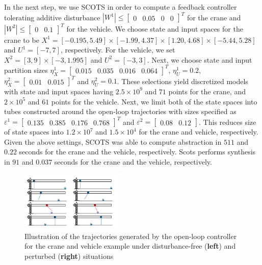 In the next step, we use SCOTS in order to compute a feedback controller tolerating additive disturbance $|W^1|\leq\begin{bmatrix}0&0.05&0&0\end{bmatrix}^T$ for the crane and $|W^2|\leq\begin{bmatrix}0&0.1\end{bmatrix}^T$ for the vehicle. %
We choose state and input spaces for the crane to be $X^{1}=[-0.195,5.49]\times[-1.99,4.37]\times[1.20,4.68]\times[-5.44,5.28]$ and $U^{1}=[-7,7]$, respectively. For the vehicle, we set $X^{2}=[3,9]\times[-3,1.995]$ and $U^{2}=[-3,3]$. %
Next, we choose state and input partition sizes $\eta_{{X}}^{1}=\begin{bmatrix}0.015&0.035&0.016&0.064\end{bmatrix}^T$, $\eta_{U}^1=0.2$,  $\eta_{{X}}^2=\begin{bmatrix}0.01&0.015\end{bmatrix}^T$ and $\eta_{U}^2=0.1$. These selections yield discretized models with state and input spaces having $2.5\times 10^9$ and $71$ points for the crane, and $2\times 10^5$ and $61$ points for the vehicle. Next, we limit both of the state spaces into tubes constructed around the open-loop trajectories with sizes specified as $\varepsilon^{1}=\begin{bmatrix}0.135&0.385&0.176 &0.768\end{bmatrix}^T$ and $\varepsilon^{2}=\begin{bmatrix}0.08&0.12\end{bmatrix}$. This reduces size of state spaces into $1.2\times 10^7$ and $1.5\times 10^4$ for the crane and vehicle, respectively. Given the above settings, SCOTS was able to compute abstraction in $511$ and $0.22$ seconds for the crane and the vehicle, respectively. Scots performs synthesis in $91$ and $0.037$ seconds for the crane and the vehicle, respectively.
			
\begin{figure}[t]
	\centering
	\includegraphics[width=0.45\textwidth]{figures/crane_and_forklifter.pdf}
	\caption{Illustration of the trajectories generated by the open-loop controller for the crane and vehicle example under disturbance-free (\textbf{left}) and perturbed (\textbf{right}) situations} 
	\label{fig:cr_and_lft_2}
\end{figure}


